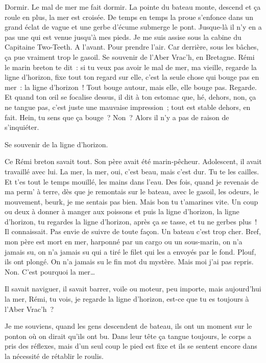 \documentclass[french,twoside]{book} %
\begin{document}
\noindent Dormir. Le mal de mer me fait dormir. La pointe du bateau monte, descend et ça roule en plus, la mer est croisée. De temps en temps la proue s’enfonce dans un grand éclat de vague et une gerbe d’écume submerge le pont. Jusque-là il n’y en a pas une qui est venue jusqu’à mes pieds. Je me suis assise sous la cabine du Capitaine Two-Teeth. A l’avant. Pour prendre l’air. Car derrière, sous les bâches, ça pue vraiment trop le gasoil. Se souvenir de l’Aber Vrac’h, en Bretagne. Rémi le marin breton te dit : si tu veux pas avoir le mal de mer, ma vieille, regarde la ligne d’horizon, fixe tout ton regard sur elle, c’est la seule chose qui bouge pas en mer : la ligne d’horizon ! Tout bouge autour, mais elle, elle bouge pas. Regarde. Et quand ton œil se focalise dessus, il dit à ton estomac que, hé, dehors, non, ça ne tangue pas, c’est juste une mauvaise impression ; tout est stable dehors, en fait. Hein, tu sens que ça bouge ? Non ? Alors il n’y a pas de raison de s’inquiéter.\par
Se souvenir de la ligne d’horizon.\par
Ce Rémi breton savait tout. Son père avait été marin-pêcheur. Adolescent, il avait travaillé avec lui. La mer, la mer, oui, c’est beau, mais c’est dur. Tu te les cailles. Et t’es tout le temps mouillé, les mains dans l’eau. Des fois, quand je revenais de ma perm’ à terre, dès que je remontais sur le bateau, avec le gasoil, les odeurs, le mouvement, beurk, je me sentais pas bien. Mais bon tu t’amarines vite. Un coup ou deux à donner à manger aux poissons et puis la ligne d’horizon, la ligne d’horizon, tu regardes la ligne d’horizon, après ça se tasse, et tu ne gerbes plus ! Il connaissait. Pas envie de suivre de toute façon. Un bateau c’est trop cher. Bref, mon père est mort en mer, harponné par un cargo ou un sous-marin, on n’a jamais su, on n’a jamais su qui a tiré le filet qui les a envoyés par le fond. Plouf, ils ont plongé. On n’a jamais su le fin mot du mystère. Mais moi j’ai pas repris. Non. C’est pourquoi la mer…\par
Il savait naviguer, il savait barrer, voile ou moteur, peu importe, mais aujourd’hui la mer, Rémi, tu vois, je regarde la ligne d’horizon, est-ce que tu es toujours à l’Aber Vrac’h ?\par
Je me souviens, quand les gens descendent de bateau, ils ont un moment sur le ponton où on dirait qu’ils ont bu. Dans leur tête ça tangue toujours, le corps a pris des réflexes, mais d’un seul coup le pied est fixe et ils se sentent encore dans la nécessité de rétablir le roulis.
\end{document}
